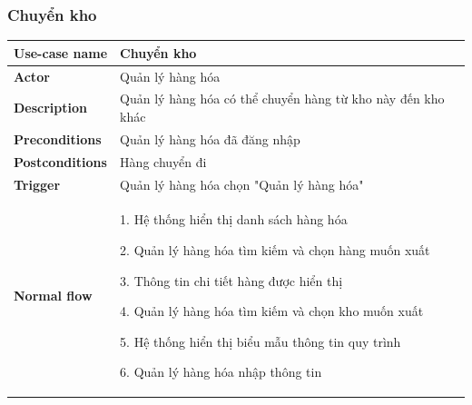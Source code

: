         \subsubsection{Chuyển kho}
        {
\setlength\extrarowheight{6pt}
            \begin{longtable}{| p{} | p{} |} 
                \hline
                    \textbf{Use-case name} 
                & 
                    Chuyển kho
                \\
                \hline
                    \textbf{Actor} 
                & 
                    Quản lý hàng hóa
                \\
                \hline
                    \textbf{Description} 
                & 
                    Quản lý hàng hóa có thể chuyển hàng từ kho này đến kho khác
                \\
                \hline
                    \textbf{Preconditions} 
                &
                    Quản lý hàng hóa đã đăng nhập
                \\
                \hline
                    \textbf{Postconditions} 
                & 
                    Hàng chuyển đi
                \\
                \hline
                    \textbf{Trigger} 
                & 
                    Quản lý hàng hóa chọn "Quản lý hàng hóa"
                \\
                \hline
                \begin{flushleft}
                    \textbf{Normal flow}
                \end{flushleft}
                & 
                1. Hệ thống hiển thị danh sách hàng hóa
                    
                    2. Quản lý hàng hóa tìm kiếm và chọn hàng muốn xuất
                    
                    3. Thông tin chi tiết hàng được hiển thị
                    
                    4. Quản lý hàng hóa tìm kiếm và chọn kho muốn xuất
                    
                    5. Hệ thống hiển thị biểu mẫu thông tin quy trình
                    
                    6. Quản lý hàng hóa nhập thông tin
                    

\end{longtable}}
